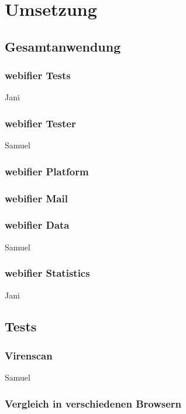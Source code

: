 \chapter{Umsetzung}
\section{Gesamtanwendung}

\subsection{webifier Tests}

\todo Jani

\subsection{webifier Tester}

\todo Samuel

\subsection{webifier Platform}

\subsection{webifier Mail}

\subsection{webifier Data}

\todo Samuel

\subsection{webifier Statistics}

\todo Jani

\section{Tests}

\subsection{Virenscan}

\todo Samuel

\subsection{Vergleich in verschiedenen Browsern}

